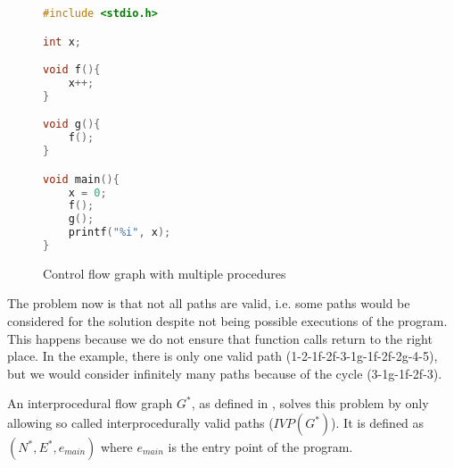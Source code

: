\begin{figure}[ht]
\begin{minipage}[t]{0.5\textwidth}
\hfill
\begin{lstlisting}[language=C]
#include <stdio.h>

int x;

void f(){
    x++;
}

void g(){
    f();
}

void main(){
    x = 0;
    f();
    g();
    printf("%i", x);
}
\end{lstlisting}
\end{minipage}
\begin{minipage}[t]{0.5\textwidth}
\vspace{0pt}
\centering
{}
\end{minipage}
  \caption{Control flow graph with multiple procedures}
  \label{fig:ivp}
\end{figure}

The problem now is that not all paths are valid, i.e. some paths would be considered for the solution despite not being possible executions of the program. This happens because we do not ensure that function calls return to the right place.
In the example, there is only one valid path (1-2-1f-2f-3-1g-1f-2f-2g-4-5), but we would consider infinitely many paths because of the cycle (3-1g-1f-2f-3).

An interprocedural flow graph $G^*$, as defined in \cite{Sharir:1981:CallStrings}, solves this problem by only allowing so called interprocedurally valid paths ($\mathit{IVP}(G^*)$). It is defined as $(N^*,E^*,e_{main})$ where $e_{main}$ is the entry point of the program.

